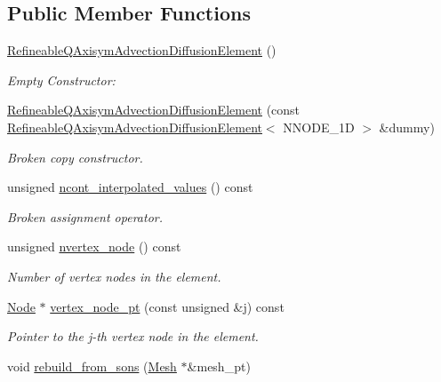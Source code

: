 \subsection*{Public Member Functions}
\begin{DoxyCompactItemize}
\item 
\hyperlink{classoomph_1_1RefineableQAxisymAdvectionDiffusionElement_aca3e1f38566c1838116d7c6a874db39e}{Refineable\+Q\+Axisym\+Advection\+Diffusion\+Element} ()
\begin{DoxyCompactList}\small\item\em Empty Constructor\+: \end{DoxyCompactList}\item 
\hyperlink{classoomph_1_1RefineableQAxisymAdvectionDiffusionElement_a35993de6ade8d5d4165e5f28ca8f749c}{Refineable\+Q\+Axisym\+Advection\+Diffusion\+Element} (const \hyperlink{classoomph_1_1RefineableQAxisymAdvectionDiffusionElement}{Refineable\+Q\+Axisym\+Advection\+Diffusion\+Element}$<$ N\+N\+O\+D\+E\+\_\+1D $>$ \&dummy)
\begin{DoxyCompactList}\small\item\em Broken copy constructor. \end{DoxyCompactList}\item 
unsigned \hyperlink{classoomph_1_1RefineableQAxisymAdvectionDiffusionElement_a6882fc29a65017f8971fcc1785556aad}{ncont\+\_\+interpolated\+\_\+values} () const
\begin{DoxyCompactList}\small\item\em Broken assignment operator. \end{DoxyCompactList}\item 
unsigned \hyperlink{classoomph_1_1RefineableQAxisymAdvectionDiffusionElement_a33f8787ec034fe65cd2b2bb00cfbf9dc}{nvertex\+\_\+node} () const
\begin{DoxyCompactList}\small\item\em Number of vertex nodes in the element. \end{DoxyCompactList}\item 
\hyperlink{classoomph_1_1Node}{Node} $\ast$ \hyperlink{classoomph_1_1RefineableQAxisymAdvectionDiffusionElement_ae9d0316ec7fa1f54500e067852e4c259}{vertex\+\_\+node\+\_\+pt} (const unsigned \&j) const
\begin{DoxyCompactList}\small\item\em Pointer to the j-\/th vertex node in the element. \end{DoxyCompactList}\item 
void \hyperlink{classoomph_1_1RefineableQAxisymAdvectionDiffusionElement_a076995e66fdcc001c2b664309a6f7b46}{rebuild\+\_\+from\+\_\+sons} (\hyperlink{classoomph_1_1Mesh}{Mesh} $\ast$\&mesh\+\_\+pt)

\end{DoxyCompactItemize}
